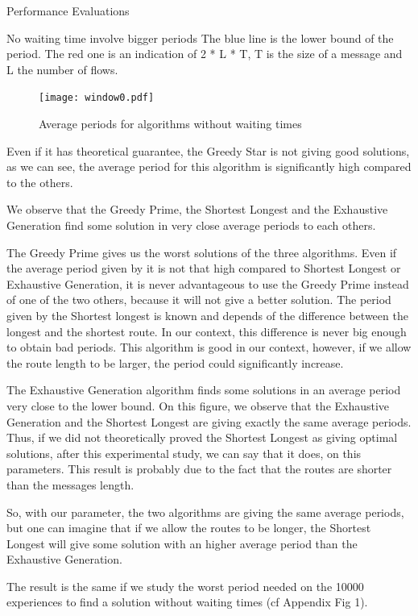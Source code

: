 \documentclass[a4paper,10pt]{report}
\begin{document}
\begin{chapter}{Performance Evaluations}
\begin{section}{No waiting time involve bigger periods}
The blue line is the lower bound of the period. The red one is an indication of 2 * L * T, T is the size of a message and L the number of flows.
\begin{figure}[H]
\hspace*{-3cm}
\centering
\texttt{[image: window0.pdf]}%
\caption{Average periods for algorithms without waiting times}
\end{figure}


Even if it has theoretical guarantee, the Greedy Star is not giving good solutions, as we can see, the average period for this algorithm is 
significantly high compared to the others.

We observe that the Greedy Prime, the Shortest Longest and the Exhaustive Generation find some solution in very close average periods to each others.

The Greedy Prime gives us the worst solutions of the three algorithms. Even if the average period given by it is not that high compared to Shortest Longest or Exhaustive Generation, it is never advantageous to use the Greedy Prime instead of one of the two others, because it will not give a better solution.
The period given by the Shortest longest is known and depends of the difference between the longest and the shortest route.
In our context, this difference is never big enough to obtain bad periods. This algorithm is good in our context, however, if we allow the 
route length to be larger, the period could significantly increase.

The Exhaustive Generation algorithm finds some solutions in an average period very close to the lower bound.
On this figure, we observe that the Exhaustive Generation and the Shortest Longest are giving exactly the same average periods.
Thus, if we did not theoretically proved the Shortest Longest as giving optimal solutions, after this experimental study, we can say that it does, on this parameters. This result is probably due to the fact that the routes are shorter than the messages length.

So, with our parameter, the two algorithms are giving the same average periods, but one can imagine that if we allow the routes to be longer, the Shortest Longest will give some solution with an higher average period than the Exhaustive Generation.

The result is the same if we study the worst period needed on the 10000 experiences to find a solution without waiting times (cf Appendix Fig 1).
\end{section}


\end{chapter}
\end{document}
